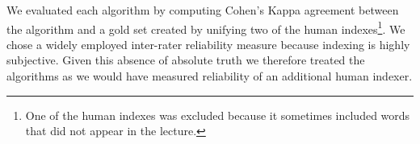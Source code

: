 
We evaluated each algorithm by computing Cohen's Kappa agreement
between the algorithm and a gold set created by unifying two of the
human indexes\footnote{One of the human indexes was excluded because
  it sometimes included words that did not appear in the lecture.}. 
We chose a widely employed inter-rater reliability measure because
indexing is highly subjective. Given this absence of absolute truth
we therefore treated the algorithms as we would have measured
reliability of an additional human indexer.

%
%

